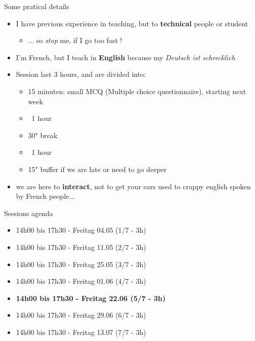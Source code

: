 { \begin{frame}
   \begin{block}{Some pratical details}
     \begin{itemize}
       \item I have previous experience in teaching, but to \textbf{technical} people or student
       \begin{itemize}
         \item ... so \textit{stop} me, if I go too fast !
       \end{itemize}
       \item I'm French, but I teach in \textbf{English} because my \textit{Deutsch ist schrecklich}
       \item Session last 3 hours, and are divided into:
       \begin{itemize}
         \item 15 minuten: small MCQ (Multiple choice questionnaire), starting next week
         \item ~1 hour
         \item 30" break
         \item ~1 hour
         \item 15" buffer if we are late or need to go deeper
       \end{itemize}
       \item we are here to \textbf{interact}, not to get your ears used to crappy english spoken by
       French people...
     \end{itemize}
   \end{block}
  \end{frame}

  \begin{frame}
    \begin{block}{Sessions agenda}
       \begin{itemize}
         \item 14h00 bis 17h30 - Freitag 04.05 (1/7 - 3h)
         \item 14h00 bis 17h30 - Freitag 11.05 (2/7 - 3h)
         \item 14h00 bis 17h30 - Freitag 25.05 (3/7 - 3h)
         \item 14h00 bis 17h30 - Freitag 01.06 (4/7 - 3h)
         \item \textbf{14h00 bis 17h30 - Freitag 22.06 (5/7 - 3h)}
         \item 14h00 bis 17h30 - Freitag 29.06 (6/7 - 3h)
         \item 14h00 bis 17h30 - Freitag 13.07 (7/7 - 3h)
      \end{itemize}
    \end{block}


\end{frame}}
